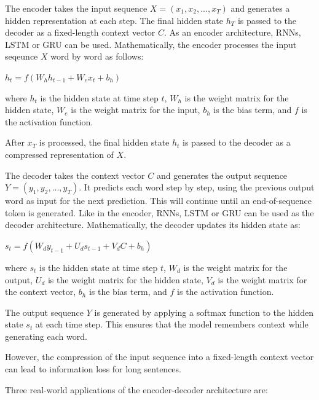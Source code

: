 \documentclass[10pt]{article}
\begin{document}
\begin{description}
The encoder takes the input sequence $X = (x_1, x_2, ..., x_T)$ and generates a hidden representation at each step.
The final hidden state $h_T$ is passed to the decoder as a fixed-length context vector $C$.
As an encoder architecture, RNNs, LSTM or GRU can be used.
Mathematically, the encoder processes the input seqeunce $X$ word by word as follows:

\begin{center}
    $h_t = f(W_{h}h_{t-1} + W_{e}x_t + b_h)$
\end{center}

where $h_t$ is the hidden state at time step $t$, $W_{h}$ is the weight matrix for the hidden state, $W_{e}$ is the weight matrix for the input, $b_h$ is the bias term, and $f$ is the activation function.

After $x_T$ is processed, the final hidden state $h_t$ is passed to the decoder as a compressed representation of $X$.

The decoder takes the context vector $C$ and generates the output sequence $Y = (y_1, y_2, ..., y_T)$.
It predicts each word step by step, using the previous output word as input for the next prediction.
This will continue until an end-of-sequence token is generated.
Like in the encoder, RNNs, LSTM or GRU can be used as the decoder architecture.
Mathematically, the decoder updates its hidden state as:

\begin{center}
    $s_t = f(W_{d}y_{t-1} + U_{d}s_{t-1} + V_{d}C + b_h)$
\end{center}

where $s_t$ is the hidden state at time step $t$, $W_{d}$ is the weight matrix for the output, $U_{d}$ is the weight matrix for the hidden state, $V_{d}$ is the weight matrix for the context vector, $b_h$ is the bias term, and $f$ is the activation function.

The output sequence $Y$ is generated by applying a softmax function to the hidden state $s_t$ at each time step.
This ensures that the model remembers context while generating each word.

However, the compression of the input sequence into a fixed-length context vector can lead to information loss for long sentences.

Three real-world applications of the encoder-decoder architecture are:


\end{description}
\end{document}
